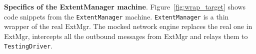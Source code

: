 

\textbf{Specifics of the ExtentManager machine}.
Figure~\ref{fig:wrap_target} shows code snippets from the \texttt{ExtentManager} \psharp machine. \texttt{ExtentManager} is a thin wrapper of the real ExtMgr. The mocked network engine replaces the real one in ExtMgr, intercepts all the outbound messages from ExtMgr and relays them to \texttt{TestingDriver}.


